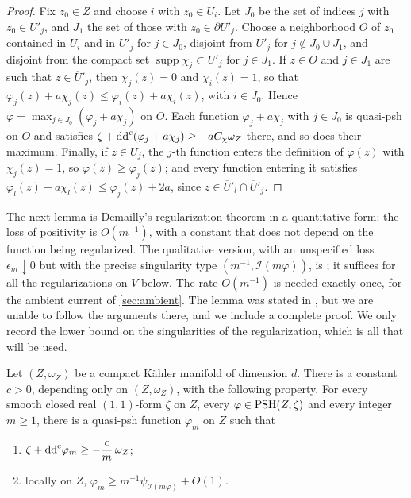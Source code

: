 \documentclass[11pt,a4paper]{amsart}
\theoremstyle{definition}
\begin{document}
\begin{proof}
Fix $z_0\in Z$ and choose $i$ with $z_0\in U_i$. Let $J_0$ be the set of
indices $j$ with $z_0\in U'_j$, and $J_1$ the set of those with
$z_0\in\partial U'_j$. Choose a neighborhood $O$ of $z_0$ contained in
$U_i$ and in $U'_j$ for $j\in J_0$, disjoint from $\overline U{}'_j$ for
$j\notin J_0\cup J_1$, and disjoint from the compact set
$\operatorname{supp}\chi_j\subset U'_j$ for $j\in J_1$. If $z\in O$ and
$j\in J_1$ are such that $z\in\overline U{}'_j$, then $\chi_j(z)=0$ and
$\chi_i(z)=1$, so that
$\varphi_j(z)+a\chi_j(z)\le\varphi_i(z)+a\chi_i(z)$, with $i\in J_0$.
Hence $\varphi=\max_{j\in J_0}(\varphi_j+a\chi_j)$ on $O$. Each function
$\varphi_j+a\chi_j$ with $j\in J_0$ is quasi-psh on $O$ and satisfies
$\zeta+\mathrm{dd}^{\mathrm{c}}(\varphi_j+a\chi_j)\ge-aC_\chi\omega_Z$ there, and so does
their maximum. Finally, if $z\in U_j$, the $j$-th function enters the
definition of $\varphi(z)$ with $\chi_j(z)=1$, so $\varphi(z)\ge\varphi_j(z)$;
and every function entering it satisfies
$\varphi_l(z)+a\chi_l(z)\le\varphi_j(z)+2a$, since
$z\in\overline U{}'_l\cap\overline U{}'_j$.
\end{proof}

The next lemma is Demailly's regularization theorem \cite{Dem92,DPS01} in
a quantitative form: the loss of positivity is $O(m^{-1})$, with a constant
that does not depend on the function being regularized. The qualitative
version, with an unspecified loss $\epsilon_m\downarrow0$ but with the
precise singularity type $(m^{-1},\mathcal I(m\varphi))$, is
\cite[Theorem~1.6.2]{XiaSGPT}; it suffices for all the regularizations on
$V$ below. The rate $O(m^{-1})$ is needed exactly once, for the ambient
current of \cref{sec:ambient}. The lemma was stated in \cite{Pop04}, but
we are unable to follow the arguments there, and we include a complete
proof. We only record the lower bound on the singularities of the
regularization, which is all that will be used.

\begin{lemma}\label{lem:regularization}
Let $(Z,\omega_Z)$ be a compact K\"ahler manifold of dimension $d$. There
is a constant $c>0$, depending only on $(Z,\omega_Z)$, with the following
property. For every smooth closed real $(1,1)$-form $\zeta$ on $Z$, every
$\varphi\in\mathrm{PSH}(Z,\zeta)$ and every integer $m\ge1$, there is a quasi-psh
function $\varphi_m$ on $Z$ such that
\begin{enumerate}[label=\textup{(\roman*)},leftmargin=*,itemsep=.2em,topsep=.3em]
\item\label{it:reg-positivity}
  $\zeta+\mathrm{dd}^{\mathrm{c}}\varphi_m\ge-\dfrac{c}{m}\,\omega_Z$;
\item\label{it:reg-lower} locally on $Z$,
  $\varphi_m\ge m^{-1}\psi_{\mathcal I(m\varphi)}+O(1)$.
\end{enumerate}
\end{lemma}
\end{document}
